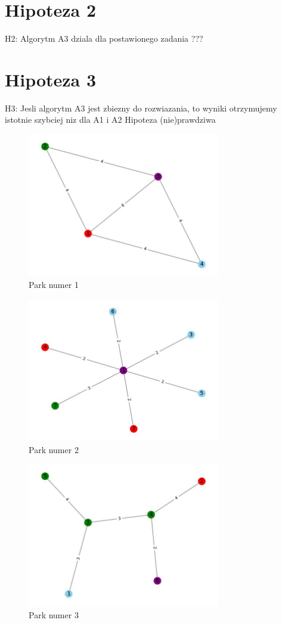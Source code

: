 \documentclass{article}
\begin{document}
\section{Hipoteza 2}
H2: Algorytm A3 dziala dla postawionego zadania
???
\section{Hipoteza 3}
H3: Jesli algorytm A3 jest zbiezny do rozwiazania, to wyniki otrzymujemy istotnie szybciej niz dla A1 i A2
Hipoteza (nie)prawdziwa
\begin{figure}[h!]
\centering
\includegraphics[width=0.75\textwidth]{1.jpg}
\caption{Park numer 1}
\end{figure}
\begin{figure}[h!]
\centering
\includegraphics[width=0.75\textwidth]{2.jpg}
\caption{Park numer 2}
\end{figure}
\begin{figure}[h!]
\centering
\includegraphics[width=0.75\textwidth]{3.jpg}
\caption{Park numer 3}
\end{figure}
\end{document}

